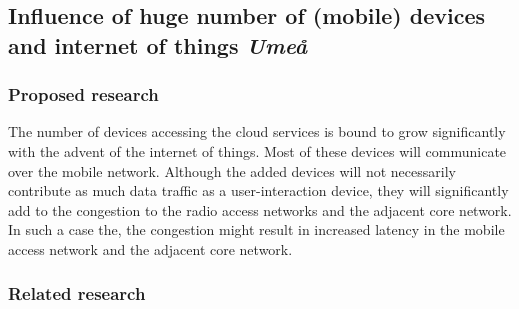 \subsection{Influence of huge number of (mobile) devices and internet of things \emph{Umeå} }
\subsubsection{Proposed research}
The number of devices accessing the cloud services is bound to grow significantly with the advent of the internet of things. Most of these devices will communicate over the mobile network. Although the added devices will not necessarily contribute as much data traffic as a user-interaction device, they will significantly add to the congestion to the radio access networks and the adjacent core network. In such a case the, the congestion might result in increased latency in the mobile access network and the adjacent core network.
\subsubsection{Related research}

